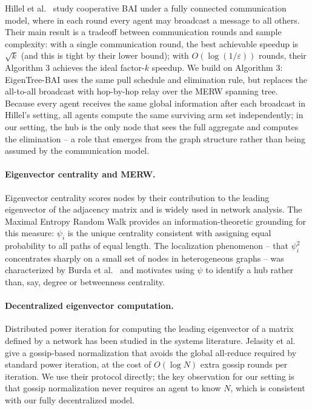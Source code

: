 \documentclass{article}
\newcommand{\merw}{EigenTree}
\begin{document}
Hillel et al.\ \cite{hillel2013distributed} study cooperative BAI under a fully connected communication model, where in each round every agent may broadcast a message to all others. Their main result is a tradeoff between communication rounds and sample complexity: with a single communication round, the best achievable speedup is $\sqrt{k}$ (and this is tight by their lower bound); with $O(\log(1/\varepsilon))$ rounds, their Algorithm 3 achieves the ideal factor-$k$ speedup. We build on Algorithm 3: \merw-BAI uses the same pull schedule and elimination rule, but replaces the all-to-all broadcast with hop-by-hop relay over the MERW spanning tree. Because every agent receives the same global information after each broadcast in Hillel's setting, all agents compute the same surviving arm set independently; in our setting, the hub is the only node that sees the full aggregate and computes the elimination -- a role that emerges from the graph structure rather than being assumed by the communication model.

\paragraph{Eigenvector centrality and MERW.}
Eigenvector centrality scores nodes by their contribution to the leading eigenvector of the adjacency matrix and is widely used in network analysis. The Maximal Entropy Random Walk \cite{burda2009localization} provides an information-theoretic grounding for this measure: $\psi_i$ is the unique centrality consistent with assigning equal probability to all paths of equal length. The localization phenomenon -- that $\psi_i^2$ concentrates sharply on a small set of nodes in heterogeneous graphs -- was characterized by Burda et al.\ \cite{burda2009localization} and motivates using $\psi$ to identify a hub rather than, say, degree or betweenness centrality.

\paragraph{Decentralized eigenvector computation.}
Distributed power iteration for computing the leading eigenvector of a matrix defined by a network has been studied in the systems literature. Jelasity et al.\ \cite{jelasity2007asynchronous} give a gossip-based normalization that avoids the global all-reduce required by standard power iteration, at the cost of $O(\log N)$ extra gossip rounds per iteration. We use their protocol directly; the key observation for our setting is that gossip normalization never requires an agent to know $N$, which is consistent with our fully decentralized model.
\end{document}
